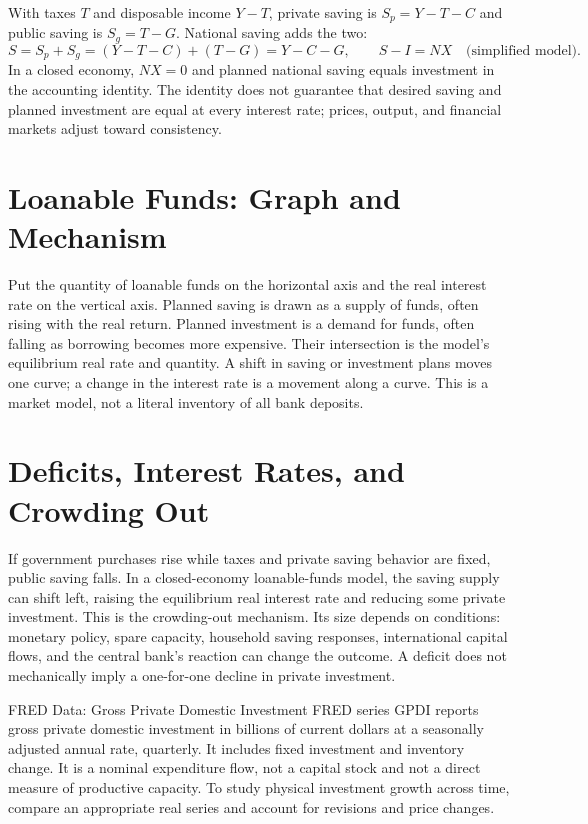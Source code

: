\documentclass[11pt,letterpaper]{article}
\begin{document}
With taxes $T$ and disposable income $Y-T$, private saving is $S_p=Y-T-C$ and public saving is $S_g=T-G$. National saving adds the two:
\begin{equation}
S=S_p+S_g=(Y-T-C)+(T-G)=Y-C-G, \qquad S-I=NX \quad\text{(simplified model)}.
\end{equation}
In a closed economy, $NX=0$ and planned national saving equals investment in the accounting identity. The identity does not guarantee that desired saving and planned investment are equal at every interest rate; prices, output, and financial markets adjust toward consistency.

\section{Loanable Funds: Graph and Mechanism}
Put the quantity of loanable funds on the horizontal axis and the real interest rate on the vertical axis. Planned saving is drawn as a supply of funds, often rising with the real return. Planned investment is a demand for funds, often falling as borrowing becomes more expensive. Their intersection is the model's equilibrium real rate and quantity. A shift in saving or investment plans moves one curve; a change in the interest rate is a movement along a curve. This is a market model, not a literal inventory of all bank deposits.

\section{Deficits, Interest Rates, and Crowding Out}
If government purchases rise while taxes and private saving behavior are fixed, public saving falls. In a closed-economy loanable-funds model, the saving supply can shift left, raising the equilibrium real interest rate and reducing some private investment. This is the crowding-out mechanism. Its size depends on conditions: monetary policy, spare capacity, household saving responses, international capital flows, and the central bank's reaction can change the outcome. A deficit does not mechanically imply a one-for-one decline in private investment.

\begin{examplecase}{FRED Data: Gross Private Domestic Investment}
FRED series GPDI reports gross private domestic investment in billions of current dollars at a seasonally adjusted annual rate, quarterly. It includes fixed investment and inventory change. It is a nominal expenditure flow, not a capital stock and not a direct measure of productive capacity. To study physical investment growth across time, compare an appropriate real series and account for revisions and price changes.
\end{examplecase}
\end{document}
